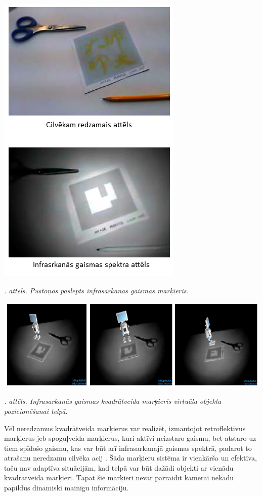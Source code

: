 \documentclass[12pt, a4paper, oneside, openright]{article}
\renewcommand{\thecimages}{\arabic{cimages}}
\begin{document}
\label{cimages:ChunWang2008_1}
\vspace{10pt}
\begin{samepage}
\begin{center}
\includegraphics[width=0.3\columnwidth]{images/ChunWang2008_1.png}
\begin{center}
\footnotesize{
\textit{\thecimages. attēls. Pustoņos paslēpts infrasarkanās gaismas marķieris.}}
\end{center}
\end{center}
\end{samepage}


\label{cimages:ChunWang2008_2}
\vspace{10pt}
\begin{samepage}
\begin{center}
\includegraphics[width=0.7\columnwidth]{images/ChunWang2008_2.png}
\begin{center}
\footnotesize{
\textit{\thecimages. attēls. Infrasarkanās gaismas kvadrātveida marķieris virtuāla objekta pozicionēšanai telpā.}}
\end{center}
\end{center}
\end{samepage}

\par
Vēl neredzamus kvadrātveida marķierus var realizēt, izmantojot retroflektīvus marķierus jeb spoguļveida 
marķierus, kuri aktīvi neizstaro gaismu, bet atstaro uz tiem spīdošo gaismu, kas var būt arī infrasarkanajā
gaismas spektrā, padarot to atrašanu neredzamu cilvēka acij \cite{YusukeNakazato2004}. 
Šāda marķieru sistēma ir vienkārša un efektīva, taču nav adaptīva situācijām, kad telpā var būt
dažādi objekti ar vienādu kvadrātveida marķieri. Tāpat šie marķieri nevar pārraidīt kamerai nekādu
papildus dinamiski mainīgu informāciju.
\end{document}
